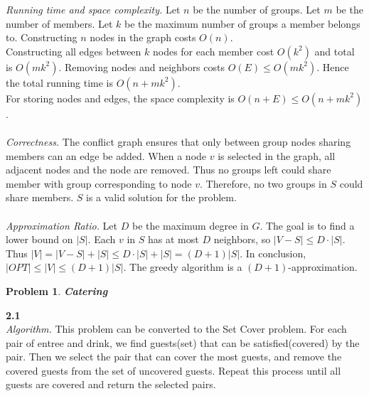 \documentclass[11pt]{exam}
\newtheorem{problem}{Problem}
\begin{document}
\noindent\textit{Running time and space complexity.}
Let $n$ be the number of groups. Let $m$ be the number of members.
Let $k$ be the maximum number of groups a member belongs to.
Constructing $n$ nodes in the graph costs $O(n)$.\\
\indent Constructing all edges between $k$ nodes for each member cost $O(k^2)$ and total is $O(mk^2)$.
Removing nodes and neighbors costs $O(E) \leq O(mk^2)$. Hence the total running time is $O(n+mk^2)$.
\\
\indent For storing nodes and edges, the space complexity is $O(n+E) \leq O(n+mk^2)$.
\\
\\
\noindent\textit{Correctness.}
The conflict graph ensures that only between group nodes sharing members can an edge be added.
When a node $v$ is selected in the graph, all adjacent nodes and the node are removed.
Thus no groups left could share member with group corresponding to node $v$.
Therefore, no two groups in $S$ could share members. $S$ is a valid solution for the problem.
\\
\\
\noindent\textit{Approximation Ratio.}
Let $D$ be the maximum degree in $G$. The goal is to find a lower bound on $|S|$. 
Each $v$ in $S$ has at most $D$ neighbors, so $|V-S| \leq D \cdot |S|$. Thus $|V|= |V-S|+|S| \leq D \cdot |S|+|S|= (D+1)|S|$.
In conclusion, $|OPT| \leq |V| \leq (D+1) |S|$. The greedy algorithm is a $(D+1)$-approximation.

\begin{problem}
    \textbf{Catering}
\end{problem}

\noindent\textbf{2.1}\\
\noindent\textit{Algorithm.}
This problem can be converted to the Set Cover problem.
For each pair of entree and drink, we find guests(set) that can be satisfied(covered) by the pair.
Then we select the pair that can cover the most guests, and remove the covered guests from the set of uncovered guests.
Repeat this process until all guests are covered and return the selected pairs.
\end{document}
